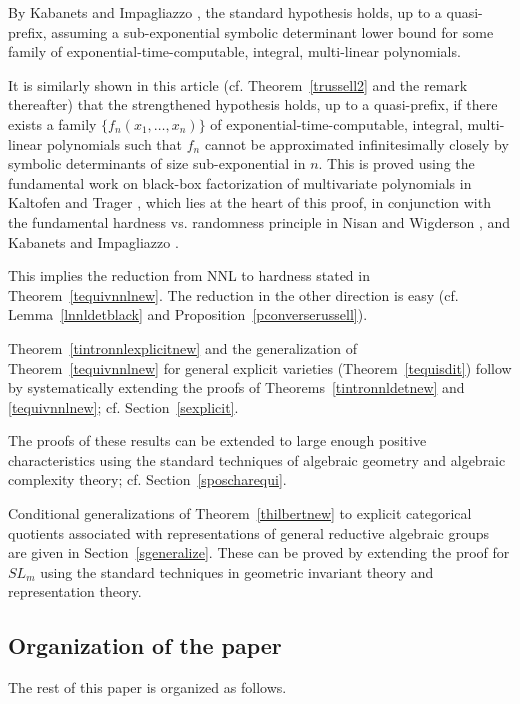 \documentclass[11pt]{article}
\begin{document}
By Kabanets and Impagliazzo \cite{russell},  
the standard  hypothesis  holds, up to a quasi-prefix, 
assuming a sub-exponential symbolic determinant
lower bound for some family of   exponential-time-computable, integral, multi-linear polynomials.

It is similarly shown in this article (cf. Theorem~\ref{trussell2} and the remark thereafter)
that the  strengthened hypothesis 
holds, up to a quasi-prefix, if
there exists 
a family $\{f_n(x_1,\ldots,x_n)\}$ of exponential-time-computable, integral, multi-linear 
polynomials such that $f_n$ 
cannot be approximated infinitesimally closely by symbolic determinants 
of  size sub-exponential in $n$.
This is proved  using the fundamental work on 
black-box factorization of multivariate polynomials 
in Kaltofen and Trager \cite{kaltofen2}, which lies at the heart of this proof, in conjunction with the fundamental hardness
vs. randomness principle in Nisan and Wigderson \cite{nisan},  and Kabanets and Impagliazzo \cite{russell}.

This implies 
the  reduction from NNL to hardness stated in Theorem~\ref{tequivnnlnew}. 
The reduction in the other direction is easy (cf. Lemma~\ref{lnnldetblack} and Proposition~\ref{pconverserussell}).

Theorem~\ref{tintronnlexplicitnew} and the generalization of Theorem~\ref{tequivnnlnew} for general explicit
varieties (Theorem~\ref{tequisdit}) 
follow by systematically extending the proofs of Theorems~\ref{tintronnldetnew} and \ref{tequivnnlnew}; cf. Section~\ref{sexplicit}.

The proofs of these results can be extended to large enough positive characteristics
using the standard techniques of algebraic geometry and
algebraic complexity theory; cf. Section~\ref{sposcharequi}.

Conditional generalizations of Theorem~\ref{thilbertnew} to explicit  categorical quotients associated with representations
of general  reductive algebraic  groups are  given  in Section~\ref{sgeneralize}. These  can be proved 
by extending the proof for $SL_m$ using the standard techniques in geometric invariant theory \cite{mumford} 
and representation theory.




\subsection*{Organization of the paper}
The rest of this paper is organized as follows.
\end{document}
